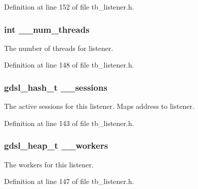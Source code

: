 Definition at line 152 of file tb\-\_\-listener.\-h.

\hypertarget{structtb__listener__t_a49ffb28f94389b1ca495a663507db665}{
\subsubsection[{\-\_\-\-\_\-num\-\_\-threads}]{\setlength{\rightskip}{0pt plus 5cm}int \-\_\-\-\_\-num\-\_\-threads}}\label{structtb__listener__t_a49ffb28f94389b1ca495a663507db665}


The number of threads for listener. 



Definition at line 148 of file tb\-\_\-listener.\-h.

\hypertarget{structtb__listener__t_a297b6218401cf4b88bf011d2665be0d2}{
\subsubsection[{\-\_\-\-\_\-sessions}]{\setlength{\rightskip}{0pt plus 5cm}gdsl\-\_\-hash\-\_\-t \-\_\-\-\_\-sessions}}\label{structtb__listener__t_a297b6218401cf4b88bf011d2665be0d2}
The active sessions for this listener. Maps address to listener. 

Definition at line 143 of file tb\-\_\-listener.\-h.

\hypertarget{structtb__listener__t_a41b2b73dc00fee2a18f90afa4987cc5b}{
\subsubsection[{\-\_\-\-\_\-workers}]{\setlength{\rightskip}{0pt plus 5cm}gdsl\-\_\-heap\-\_\-t \-\_\-\-\_\-workers}}\label{structtb__listener__t_a41b2b73dc00fee2a18f90afa4987cc5b}


The workers for this listener. 



Definition at line 147 of file tb\-\_\-listener.\-h.

